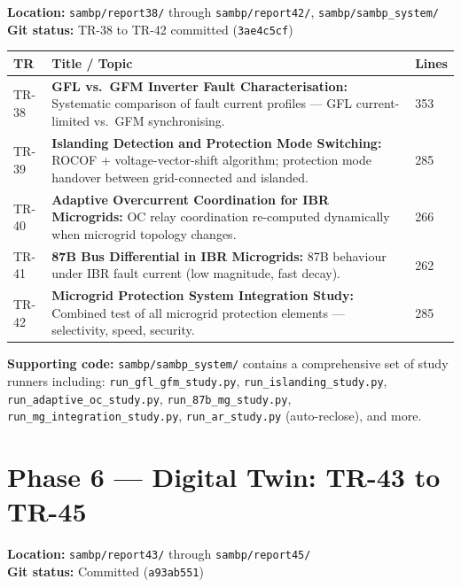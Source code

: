 \documentclass[11pt,a4paper]{article}
\begin{document}
\begin{phasebox}
\textbf{Location:} \texttt{sambp/report38/} through \texttt{sambp/report42/},
\texttt{sambp/sambp\_system/}\\
\textbf{Git status:} TR-38 to TR-42 committed (\texttt{3ae4c5cf})
\end{phasebox}

\begin{longtable}{lp{9.5cm}l}
\toprule
\textbf{TR} & \textbf{Title / Topic} & \textbf{Lines} \\
\midrule
\endhead
TR-38 & \textbf{GFL vs.\ GFM Inverter Fault Characterisation:} Systematic comparison of fault current profiles — GFL current-limited vs.\ GFM synchronising. & 353 \\[3pt]
TR-39 & \textbf{Islanding Detection and Protection Mode Switching:} ROCOF + voltage-vector-shift algorithm; protection mode handover between grid-connected and islanded. & 285 \\[3pt]
TR-40 & \textbf{Adaptive Overcurrent Coordination for IBR Microgrids:} OC relay coordination re-computed dynamically when microgrid topology changes. & 266 \\[3pt]
TR-41 & \textbf{87B Bus Differential in IBR Microgrids:} 87B behaviour under IBR fault current (low magnitude, fast decay). & 262 \\[3pt]
TR-42 & \textbf{Microgrid Protection System Integration Study:} Combined test of all microgrid protection elements — selectivity, speed, security. & 285 \\[3pt]
\bottomrule
\end{longtable}

\textbf{Supporting code:} \texttt{sambp/sambp\_system/} contains a comprehensive
set of study runners including:
\texttt{run\_gfl\_gfm\_study.py},
\texttt{run\_islanding\_study.py},
\texttt{run\_adaptive\_oc\_study.py},
\texttt{run\_87b\_mg\_study.py},
\texttt{run\_mg\_integration\_study.py},
\texttt{run\_ar\_study.py} (auto-reclose),
and more.

\section{Phase 6 — Digital Twin: TR-43 to TR-45}

\begin{phasebox}
\textbf{Location:} \texttt{sambp/report43/} through \texttt{sambp/report45/}\\
\textbf{Git status:} Committed (\texttt{a93ab551})
\end{phasebox}
\end{document}
